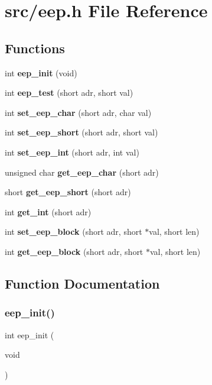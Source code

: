 \section{src/eep.h File Reference}
\label{eep_8h}
\subsection*{Functions}
\begin{DoxyCompactItemize}
\item 
int \textbf{ eep\+\_\+init} (void)
\item 
int \textbf{ eep\+\_\+test} (short adr, short val)
\item 
int \textbf{ set\+\_\+eep\+\_\+char} (short adr, char val)
\item 
int \textbf{ set\+\_\+eep\+\_\+short} (short adr, short val)
\item 
int \textbf{ set\+\_\+eep\+\_\+int} (short adr, int val)
\item 
unsigned char \textbf{ get\+\_\+eep\+\_\+char} (short adr)
\item 
short \textbf{ get\+\_\+eep\+\_\+short} (short adr)
\item 
int \textbf{ get\+\_\+int} (short adr)
\item 
int \textbf{ set\+\_\+eep\+\_\+block} (short adr, short $\ast$val, short len)
\item 
int \textbf{ get\+\_\+eep\+\_\+block} (short adr, short $\ast$val, short len)
\end{DoxyCompactItemize}


\subsection{Function Documentation}
\mbox{\label{eep_8h_afb721546536cc5742f6adb92bdb228d6}} 
\subsubsection{eep\+\_\+init()}
{\footnotesize\ttfamily int eep\+\_\+init (\begin{DoxyParamCaption}\item[{void}]{ }\end{DoxyParamCaption})}

\mbox{\label{eep_8h_a653020ef532b2877fdd8abc411fc0cfb}} 
